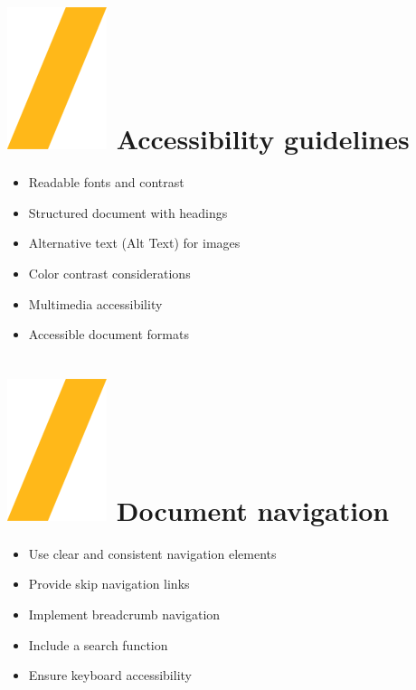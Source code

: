 \documentclass[a0paper,fleqn]{src/betterposter}
\begin{document}
{\section{\includegraphics[height=\fontcharht\font`\S]{img/general/slash.png} Accessibility guidelines}

\begin{itemize}
\item Readable fonts and contrast
\item Structured document with headings
\item Alternative text (Alt Text) for images
\item Color contrast considerations
\item Multimedia accessibility
\item Accessible document formats
\end{itemize}

\section{\includegraphics[height=\fontcharht\font`\S]{img/general/slash.png} Document navigation}

\begin{itemize}
\item Use clear and consistent navigation elements
\item Provide skip navigation links
\item Implement breadcrumb navigation
\item Include a search function
\item Ensure keyboard accessibility
\end{itemize}



}
\end{document}
